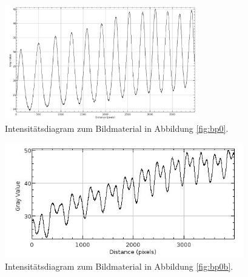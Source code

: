 \begin{figure}[h!]
  \centering
  \includegraphics[height=5cm]{pics/Plot_480nm_B=0_P=0.jpg}
  \caption{Intensitätsdiagram zum Bildmaterial in Abbildung \ref{fig:bp0}.}
  \label{fig:p3}
\end{figure}
\begin{figure}[h!]
  \centering
  \includegraphics[height=5cm]{pics/Plot_480nm_I=5.5_P=0.jpg}
  \caption{Intensitätsdiagram zum Bildmaterial in Abbildung \ref{fig:bp0b}.}
  \label{fig:p4}
\end{figure}

